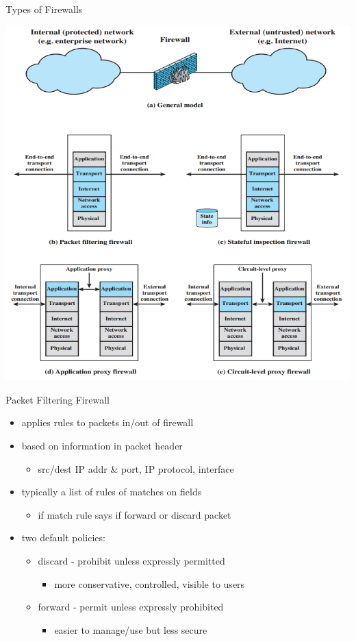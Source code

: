 \documentclass{beamer}
\begin{document}
\begin{frame}{Types of Firewalls}
  
  \begin{center}
    \includegraphics[width=0.6\linewidth]{firewall-type}
  \end{center}
\end{frame}

\begin{frame}{Packet Filtering Firewall}
  \begin{itemize}
  \item applies rules to packets in/out of firewall 
  \item based on information in packet header 
    \begin{itemize}
    \item src/dest IP addr \& port, IP protocol, interface 
    \end{itemize}
  \item typically a list of rules of matches on fields 
    \begin{itemize}
    \item if match rule says if forward or discard packet 
    \end{itemize}
  \item two default policies: 
    \begin{itemize}
    \item discard - prohibit unless expressly permitted 
      \begin{itemize}
      \item more conservative, controlled, visible to users 
      \end{itemize}
    \end{itemize}
    \begin{itemize}
    \item forward - permit unless expressly prohibited 
      \begin{itemize}
      \item easier to manage/use but less secure 
      \end{itemize}
    \end{itemize}
  \end{itemize}
\end{frame}
\end{document}
